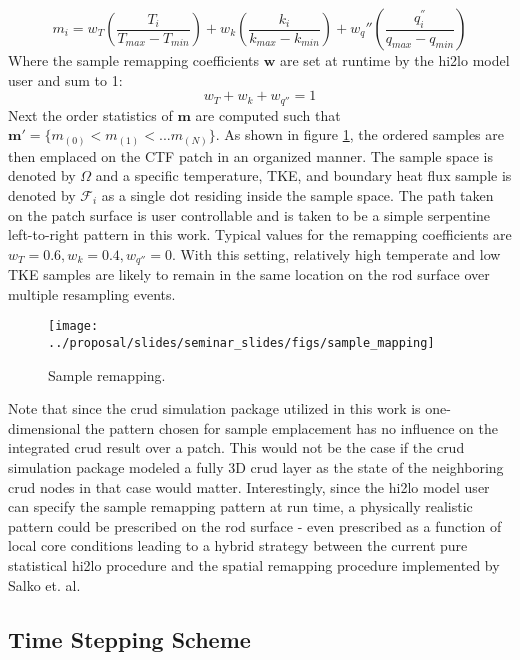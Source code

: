 \begin{equation}
m_i = w_T \left( \frac{T_i}{T_{max} - T_{min}} \right) + w_k \left( \frac{k_i}{k_{max} - k_{min}} \right) +  w_q'' \left( \frac{q^{''}_i}{q_{max} - q_{min}} \right)
\label{eq:weighting}
\end{equation}
Where the sample remapping coefficients $\mathbf w$ are set at runtime by the hi2lo model user and sum to 1:
\begin{equation}
w_T + w_k + w_{q''} = 1
\end{equation}
Next the order statistics of $\mathbf m$ are computed such that $\mathbf m' = \{ m_{(0)} < m_{(1)}< ... m_{(N)} \}$.  As shown in figure \ref{fig:samplemapping}, the ordered samples are then emplaced on the CTF patch in an organized manner.  The sample space is denoted by $\Omega$ and a specific temperature, TKE, and boundary heat flux sample is denoted by $\mathcal F_i$ as a single dot residing inside the sample space.  The path taken on the patch surface is user controllable and is taken to be a simple serpentine left-to-right pattern in this work.
Typical values for the remapping coefficients are $w_T=0.6, w_k=0.4, w_{q''}=0$.  With this setting, relatively high temperate and low TKE samples are likely to remain in the same location on the rod surface over multiple resampling events.

\begin{figure}[H]
    \centering
    \texttt{[image: ../proposal/slides/seminar\_slides/figs/sample\_mapping]}
    \caption{Sample remapping.}
    \label{fig:samplemapping}
\end{figure}

Note that since the crud simulation package utilized in this work is one-dimensional the pattern chosen for sample emplacement has no influence on the integrated crud result over a patch.  This would not be the case if the crud simulation package modeled a fully 3D crud layer as the state of the neighboring crud nodes in that case would matter.  Interestingly, since the hi2lo model user  can specify the sample remapping pattern at run time, a physically realistic pattern could be prescribed on the rod surface - even prescribed as a function of local core conditions leading to a hybrid strategy between the current pure statistical hi2lo procedure and the spatial remapping procedure implemented by Salko et. al.

\subsection{Time Stepping Scheme}

